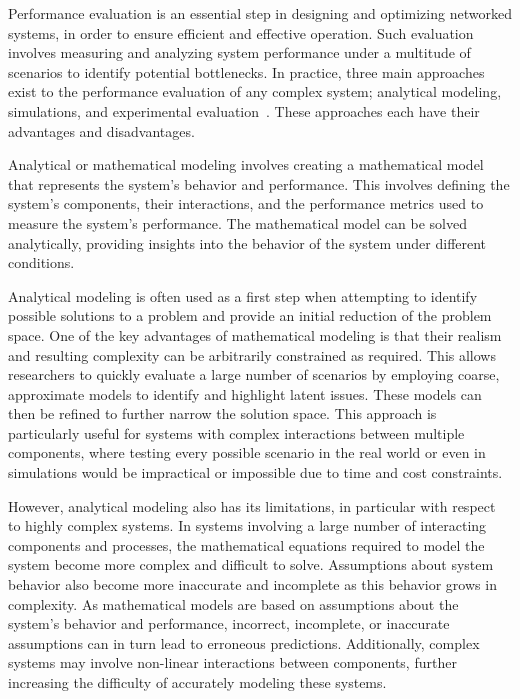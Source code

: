 Performance evaluation is an essential step in designing and optimizing networked systems, in order to ensure efficient and effective operation.
Such evaluation involves measuring and analyzing system performance under a multitude of scenarios to identify potential bottlenecks.
In practice, three main approaches exist to the performance evaluation of any complex system; analytical modeling, simulations, and experimental evaluation~\cite{fernandes2017performance}.
These approaches each have their advantages and disadvantages.

Analytical or mathematical modeling involves creating a mathematical model that represents the system's behavior and performance.
This involves defining the system's components, their interactions, and the performance metrics used to measure the system's performance.
The mathematical model can be solved analytically, providing insights into the behavior of the system under different conditions.

Analytical modeling is often used as a first step when attempting to identify possible solutions to a problem and provide an initial reduction of the problem space.
One of the key advantages of mathematical modeling is that their realism and resulting complexity can be arbitrarily constrained as required.
This allows researchers to quickly evaluate a large number of scenarios by employing coarse, approximate models to identify and highlight latent issues.
These models can then be refined to further narrow the solution space.
This approach is particularly useful for systems with complex interactions between multiple components, where testing every possible scenario in the real world or even in simulations would be impractical or impossible due to time and cost constraints.

However, analytical modeling also has its limitations, in particular with respect to highly complex systems.
In systems involving a large number of interacting components and processes, the mathematical equations required to model the system become more complex and difficult to solve.
Assumptions about system behavior also become more inaccurate and incomplete as this behavior grows in complexity.
As mathematical models are based on assumptions about the system's behavior and performance, incorrect, incomplete, or inaccurate assumptions can in turn lead to erroneous predictions.
Additionally, complex systems may involve non-linear interactions between components, further increasing the difficulty of accurately modeling these systems.

